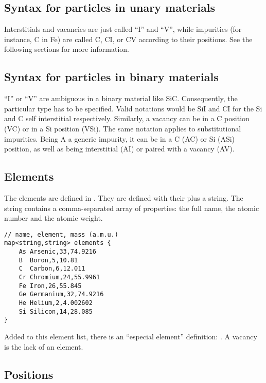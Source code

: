 \subsection{Syntax for particles in unary materials}

Interstitials and vacancies are just called ``I'' and ``V'', while impurities (for instance, C in Fe) are called C, CI, or CV according to their positions. See the following sections for more information.

\subsection{Syntax for particles in binary materials} 

``I'' or ``V'' are ambiguous in a binary material like SiC. Consequently, the particular type has to be specified. Valid notations would be SiI and CI for the Si and C self interstitial respectively. Similarly, a vacancy can be in a C position (VC) or in a Si position (VSi). The same notation applies to substitutional impurities. Being A a generic impurity, it can be in a C (AC) or Si (ASi) position, as well as being interstitial (AI) or paired with a vacancy (AV).

\subsection{Elements}

The elements are defined in . They are defined with their  plus a string. The string contains a comma-separated array of properties: the full name, the atomic number and the atomic weight.

\begin{lstlisting}
// name, element, mass (a.m.u.)
map<string,string> elements {
    As Arsenic,33,74.9216
    B  Boron,5,10.81
    C  Carbon,6,12.011
    Cr Chromium,24,55.9961
    Fe Iron,26,55.845
    Ge Germanium,32,74.9216
    He Helium,2,4.002602
    Si Silicon,14,28.085
}
\end{lstlisting}

Added to this element list, there is an ``especial element'' definition: . A vacancy is the lack of an element. 

\subsection{Positions}
\label{sec:position}

